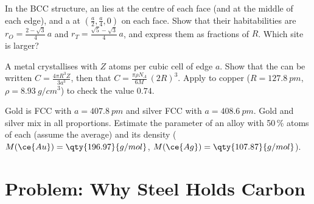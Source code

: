 \begin{exercise}[$\star\star\star$]\label{exo:b1:crystals-metals:10}
In the BCC structure, an  lies at the centre of each face
(and at the middle of each edge), and a  at
$(\frac{a}{2}, \frac{a}{4}, 0)$ on each face. Show that their
habitabilities are $r_O = \frac{2 - \sqrt3}{4}\,a$ and
$r_T = \frac{\sqrt5 - \sqrt3}{4}\,a$, and express them as fractions of
$R$. Which site is larger?
\end{exercise}

\begin{exercise}[$\star\star\star$]\label{exo:b1:crystals-metals:11}
A metal crystallises with $Z$ atoms per cubic cell of edge $a$. Show that
the  can be written $C = \frac{4\pi R^3 Z}{3a^3}$, then that
$C = \frac{\pi\rho N_A}{6M}\,(2R)^3$. Apply to copper ($R = \qty{127.8}{pm}$,
$\rho = \qty{8.93}{g/cm^3}$) to check the value $0.74$.
\end{exercise}

\begin{exercise}[$\star\star\star$]\label{exo:b1:crystals-metals:12}
Gold is FCC with $a = \qty{407.8}{pm}$ and silver FCC with
$a = \qty{408.6}{pm}$. Gold and silver mix in all proportions. Estimate the
 parameter of an alloy with 50\,\% atoms of each (assume the
average) and its density ($M(\ce{Au}) = \qty{196.97}{g/mol}$,
$M(\ce{Ag}) = \qty{107.87}{g/mol}$).
\end{exercise}

\section{Problem: Why Steel Holds Carbon}

